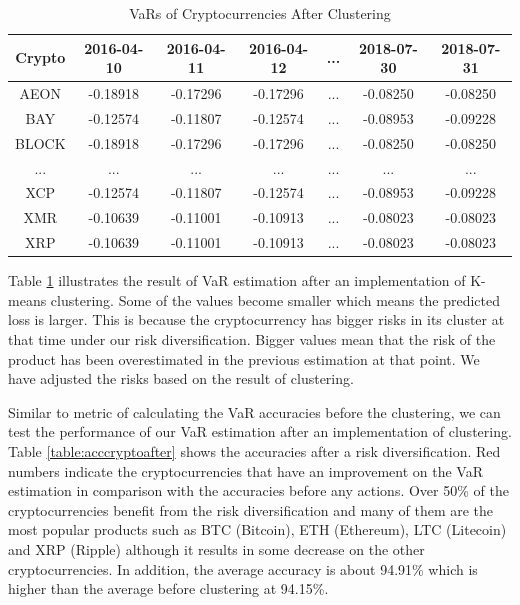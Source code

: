 \documentclass[11pt]{article} %
\theoremstyle{plain}
\theoremstyle{definition}
\begin{document}
{
  \begin{table}[ht]
    \centering
    \small
    \begin{tabular}{|c|c c c c c c|}
        \hline
        Crypto & 2016-04-10 & 2016-04-11 & 2016-04-12 & ... & 2018-07-30 & 2018-07-31 \\ [0.5ex]
        \hline
        AEON & -0.18918 & -0.17296 & -0.17296 & ... & -0.08250 & -0.08250 \\
        \hline
        BAY & -0.12574 & -0.11807 & -0.12574 & ... & -0.08953 & -0.09228 \\
        \hline
        BLOCK & -0.18918 & -0.17296 & -0.17296 & ... & -0.08250 & -0.08250 \\
        \hline
        ... & ... & ... & ... & ... & ... & ... \\
        \hline
        XCP & -0.12574 & -0.11807 & -0.12574 & ... & -0.08953 & -0.09228 \\
        \hline
        XMR & -0.10639 & -0.11001 & -0.10913 & ... & -0.08023 & -0.08023 \\
        \hline
        XRP & -0.10639 & -0.11001 & -0.10913 & ... & -0.08023 & -0.08023 \\
        \hline
    \end{tabular}
    \caption{VaRs of Cryptocurrencies After Clustering}
    \label{table:varcryptoafter}
  \end{table}
}

Table \ref{table:varcryptoafter} illustrates the result of VaR estimation after an implementation of K-means clustering. Some of the values become smaller which means the predicted loss is larger. This is because the cryptocurrency has bigger risks in its cluster at that time under our risk diversification. Bigger values mean that the risk of the product has been overestimated in the previous estimation at that point. We have adjusted the risks based on the result of clustering.

Similar to metric of calculating the VaR accuracies before the clustering, we can test the performance of our VaR estimation after an implementation of clustering. Table \ref{table:acccryptoafter} shows the accuracies after a risk diversification. Red numbers indicate the cryptocurrencies that have an improvement on the VaR estimation in comparison with the accuracies before any actions. Over 50\% of the cryptocurrencies benefit from the risk diversification and many of them are the most popular products such as BTC (Bitcoin), ETH (Ethereum), LTC (Litecoin) and XRP (Ripple) although it results in some decrease on the other cryptocurrencies. In addition, the average accuracy is about 94.91\% which is higher than the average before clustering at 94.15\%.
\end{document}
